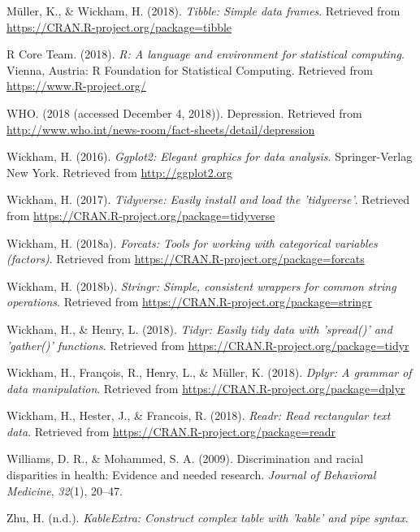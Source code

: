 \documentclass[man]{apa6}
\begin{document}
\hypertarget{ref-R-tibble}{}
Müller, K., \& Wickham, H. (2018). \emph{Tibble: Simple data frames}.
Retrieved from \url{https://CRAN.R-project.org/package=tibble}

\hypertarget{ref-R-base}{}
R Core Team. (2018). \emph{R: A language and environment for statistical
computing}. Vienna, Austria: R Foundation for Statistical Computing.
Retrieved from \url{https://www.R-project.org/}

\hypertarget{ref-who}{}
WHO. (2018 (accessed December 4, 2018)). Depression. Retrieved from
\url{http://www.who.int/news-room/fact-sheets/detail/depression}

\hypertarget{ref-R-ggplot2}{}
Wickham, H. (2016). \emph{Ggplot2: Elegant graphics for data analysis}.
Springer-Verlag New York. Retrieved from \url{http://ggplot2.org}

\hypertarget{ref-R-tidyverse}{}
Wickham, H. (2017). \emph{Tidyverse: Easily install and load the
'tidyverse'}. Retrieved from
\url{https://CRAN.R-project.org/package=tidyverse}

\hypertarget{ref-R-forcats}{}
Wickham, H. (2018a). \emph{Forcats: Tools for working with categorical
variables (factors)}. Retrieved from
\url{https://CRAN.R-project.org/package=forcats}

\hypertarget{ref-R-stringr}{}
Wickham, H. (2018b). \emph{Stringr: Simple, consistent wrappers for
common string operations}. Retrieved from
\url{https://CRAN.R-project.org/package=stringr}

\hypertarget{ref-R-tidyr}{}
Wickham, H., \& Henry, L. (2018). \emph{Tidyr: Easily tidy data with
'spread()' and 'gather()' functions}. Retrieved from
\url{https://CRAN.R-project.org/package=tidyr}

\hypertarget{ref-R-dplyr}{}
Wickham, H., François, R., Henry, L., \& Müller, K. (2018). \emph{Dplyr:
A grammar of data manipulation}. Retrieved from
\url{https://CRAN.R-project.org/package=dplyr}

\hypertarget{ref-R-readr}{}
Wickham, H., Hester, J., \& Francois, R. (2018). \emph{Readr: Read
rectangular text data}. Retrieved from
\url{https://CRAN.R-project.org/package=readr}

\hypertarget{ref-williams2009discrimination}{}
Williams, D. R., \& Mohammed, S. A. (2009). Discrimination and racial
disparities in health: Evidence and needed research. \emph{Journal of
Behavioral Medicine}, \emph{32}(1), 20--47.

\hypertarget{ref-R-kableExtra}{}
Zhu, H. (n.d.). \emph{KableExtra: Construct complex table with 'kable'
and pipe syntax}.

\endgroup
\end{document}
